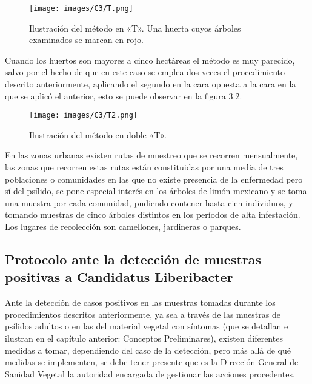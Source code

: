 \begin{figure}[H]
\centering
\texttt{[image: images/C3/T.png]}
\caption{Ilustración del método en «T». Una huerta cuyos árboles examinados se marcan en rojo.}
\end{figure}

Cuando los huertos son mayores a cinco hectáreas el método es muy parecido, salvo por el hecho de que en este caso se emplea dos veces el procedimiento descrito anteriormente, aplicando el segundo en la cara opuesta a la cara en la que se aplicó el anterior, esto se puede observar en la figura 3.2.

\begin{figure}[H]
\centering
\texttt{[image: images/C3/T2.png]}
\caption{Ilustración del método en doble «T».}
\end{figure}

En las zonas urbanas existen rutas de muestreo que se recorren mensualmente, las zonas que recorren estas rutas están constituidas por una media de tres poblaciones o comunidades en las que no existe presencia de la enfermedad pero sí del psílido, se pone especial interés en los árboles de limón mexicano y se toma una muestra por cada comunidad, pudiendo contener hasta cien individuos, y tomando muestras de cinco árboles distintos en los períodos de alta infestación. Los lugares de recolección son camellones, jardineras o parques. 

\subsection{Protocolo ante la detección de muestras positivas a Candidatus Liberibacter}
Ante la detección de casos positivos en las muestras tomadas durante los procedimientos descritos anteriormente, ya sea a través de las muestras de psílidos adultos o en las del material vegetal con síntomas (que se detallan e ilustran en el capítulo anterior: Conceptos Preliminares), existen diferentes medidas a tomar, dependiendo del caso de la detección, pero más allá de qué medidas se implementen, se debe tener presente que es la Dirección General de Sanidad Vegetal la autoridad encargada de gestionar las acciones procedentes.\\

